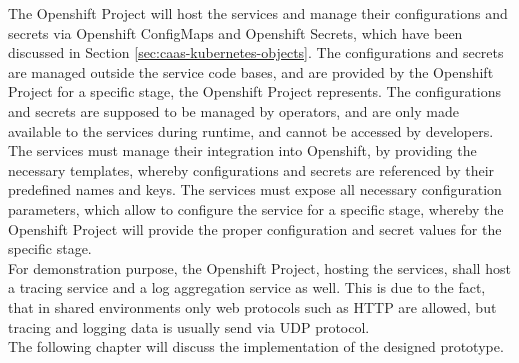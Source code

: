 The Openshift Project will host the services and manage their configurations and secrets via Openshift ConfigMaps and Openshift Secrets, which have been discussed in Section \vref{sec:caas-kubernetes-objects}. The configurations and secrets are managed outside the service code bases, and are provided by the Openshift Project for a specific stage, the Openshift Project represents. The configurations and secrets are supposed to be managed by operators, and are only made available to the services during runtime, and cannot be accessed by developers. \\

The services must manage their integration into Openshift, by providing the necessary templates, whereby configurations and secrets are referenced by their predefined names and keys. The services must expose all necessary configuration parameters, which allow to configure the service for a specific stage, whereby the Openshift Project will provide the proper configuration and secret values for the specific stage. \\

For demonstration purpose, the Openshift Project, hosting the services, shall host a tracing service and a log aggregation service as well. This is due to the fact, that in shared environments only web protocols such as HTTP are allowed, but tracing and logging data is usually send via UDP protocol. \\

The following chapter will discuss the implementation of the designed prototype. 
